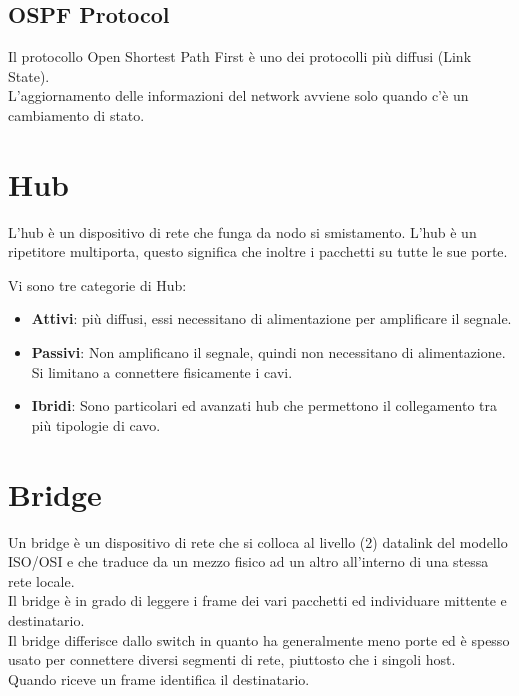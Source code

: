 \documentclass{article}
\begin{document}
\subsection{OSPF Protocol}

Il protocollo Open Shortest Path First è uno dei protocolli più diffusi (Link State).
\\
L'aggiornamento delle informazioni del network avviene solo quando c'è un cambiamento di stato.


\section{Hub}

L'hub è un dispositivo di rete che funga da nodo si smistamento.
L'hub è un ripetitore multiporta, questo significa che inoltre i pacchetti su tutte le sue porte.

Vi sono tre categorie di Hub:

\begin{itemize}
    \item \textbf{Attivi}: più diffusi, essi necessitano di alimentazione per amplificare il segnale.

    \item \textbf{Passivi}: Non amplificano il segnale, quindi non
        necessitano di alimentazione. Si limitano a connettere fisicamente i cavi.

    \item \textbf{Ibridi}: Sono particolari ed avanzati hub che permettono il collegamento tra più
        tipologie di cavo.
\end{itemize}

\section{Bridge}

Un bridge è un dispositivo di rete che si colloca al livello (2) datalink del modello ISO/OSI e che
traduce da un mezzo fisico ad un altro all'interno di una stessa rete locale.
\\
Il bridge è in grado di leggere i frame dei vari pacchetti ed individuare mittente e destinatario.
\\
Il bridge differisce dallo switch in quanto ha generalmente meno porte ed è spesso usato per
connettere diversi segmenti di rete, piuttosto che i singoli host.
\\
Quando riceve un frame identifica il destinatario.
\end{document}
